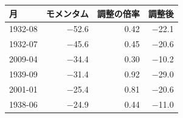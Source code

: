 \begin{tabular}{lrrr}
\toprule
月 & モメンタム & 調整の倍率 & 調整後 \\
\midrule
1932-08 & \ensuremath{-}52.6 & 0.42 & \ensuremath{-}22.1 \\
1932-07 & \ensuremath{-}45.6 & 0.45 & \ensuremath{-}20.6 \\
2009-04 & \ensuremath{-}34.4 & 0.30 & \ensuremath{-}10.2 \\
1939-09 & \ensuremath{-}31.4 & 0.92 & \ensuremath{-}29.0 \\
2001-01 & \ensuremath{-}25.4 & 0.81 & \ensuremath{-}20.6 \\
1938-06 & \ensuremath{-}24.9 & 0.44 & \ensuremath{-}11.0 \\
\bottomrule
\end{tabular}

